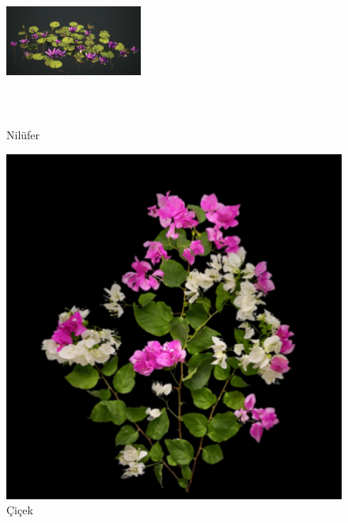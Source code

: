 \documentclass[12pt, a4paper]{article}
\begin{document}
	\begin{figure}[!ht]%
		\begin{minipage}{0.48\textwidth}
			\centering
			\includegraphics[width=45mm , height=48mm]{aquatic.png}
			\caption{Nilüfer}\label{Fig:Data5}
		\end{minipage}\hfill
		\begin{minipage}{0.48\textwidth}
			\centering
			\includegraphics[width=.7\linewidth]{flower2.png}
			\caption{Çiçek}\label{Fig:Data6}
		\end{minipage}
	\end{figure}
	
\end{document}
